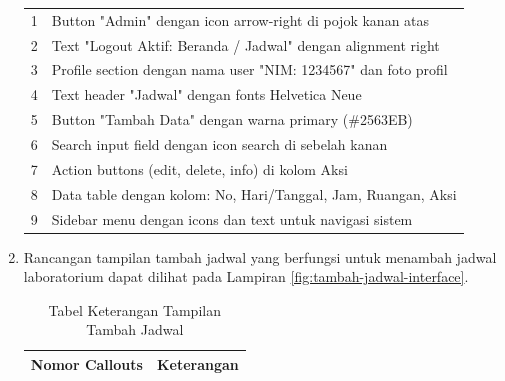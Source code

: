 \begin{enumerate}
{\begin{longtable}{c p{}}
			      1                       & Button "Admin" dengan icon arrow-right di pojok kanan atas                            \\
			      2                       & Text "Logout Aktif: Beranda / Jadwal" dengan alignment right                          \\
			      3                       & Profile section dengan nama user "NIM: 1234567" dan foto profil                       \\
			      4                       & Text header "Jadwal" dengan fonts Helvetica Neue                                      \\
			      5                       & Button "Tambah Data" dengan warna primary (\#2563EB)                                  \\
			      6                       & Search input field dengan icon search di sebelah kanan                                \\
			      7                       & Action buttons (edit, delete, info) di kolom Aksi                                     \\
			      8                       & Data table dengan kolom: No, Hari/Tanggal, Jam, Ruangan, Aksi                         \\
			      9                       & Sidebar menu dengan icons dan text untuk navigasi sistem                              \\
			      \hline
		      \end{longtable}
	      }

	\item Rancangan tampilan tambah jadwal yang berfungsi untuk menambah jadwal laboratorium dapat dilihat pada Lampiran \ref{fig:tambah-jadwal-interface}.



	      {
	      \selectfont
	      \begin{longtable}{c p{}}
		      \caption{Tabel Keterangan Tampilan Tambah Jadwal}
		      \label{tab:tambah-jadwal}                                                                                                                                                               \\
		      \hline
		      \textbf{Nomor Callouts} & \textbf{Keterangan}                                                                                                                                           \\
		      \hline
		      \endfirsthead


\end{longtable}}
\end{enumerate}
